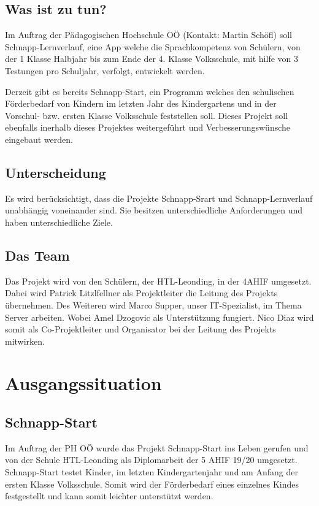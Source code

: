 \documentclass[12pt]{article}
\theoremstyle{definition}
\begin{document}
\subsection{Was ist zu tun?}
Im Auftrag der Pädagogischen Hochschule OÖ (Kontakt: Martin Schöfl) soll Schnapp-Lernverlauf, eine App welche die Sprachkompetenz von Schülern, von der 1 Klasse Halbjahr bis zum Ende der 4. Klasse Volksschule, mit hilfe von 3 Testungen pro Schuljahr, verfolgt, entwickelt werden.

Derzeit gibt es bereits Schnapp-Start, ein Programm welches den schulischen Förderbedarf von Kindern im letzten Jahr des Kindergartens und in der Vorschul- bzw. ersten Klasse Volksschule feststellen soll. Dieses Projekt soll ebenfalls inerhalb dieses Projektes weitergeführt und Verbesserungswünsche eingebaut werden.
\newline
\subsection{Unterscheidung}
Es wird berücksichtigt, dass die Projekte Schnapp-Srart und Schnapp-Lernverlauf unabhängig voneinander sind.  Sie besitzen unterschiedliche Anforderungen und haben unterschiedliche Ziele.
\newline
\subsection{Das Team}
Das Projekt wird von den Schülern, der HTL-Leonding, in der 4AHIF umgesetzt. Dabei wird Patrick Litzlfellner als Projektleiter die Leitung des Projekts übernehmen. Des Weiteren wird Marco Supper, unser IT-Spezialist, im Thema Server arbeiten. Wobei Amel Dzogovic als Unterstützung fungiert. Nico Diaz wird somit als Co-Projektleiter und Organisator bei der Leitung des Projekts mitwirken.

\pagebreak

\section{Ausgangssituation}

\subsection{Schnapp-Start}
Im Auftrag der PH OÖ wurde das Projekt Schnapp-Start ins Leben gerufen und von der Schule HTL-Leonding als Diplomarbeit der 5 AHIF 19/20 umgesetzt. Schnapp-Start testet Kinder, im letzten Kindergartenjahr und am Anfang der ersten Klasse Volksschule. Somit wird der Förderbedarf eines einzelnes Kindes festgestellt und kann somit leichter unterstützt werden.
\end{document}
